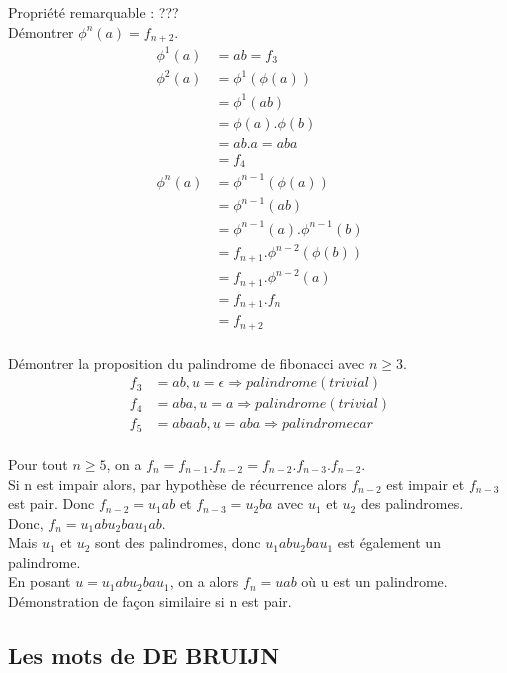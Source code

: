 \documentclass[11pt,a4paper]{article}
\begin{document}
	Propriété remarquable : ???\\
	
	Démontrer $\phi^{n}(a) = f_{n+2}$.
	\begin{align*}
		\phi^{1}(a) &= ab = f_{3}\\
		\phi^{2}(a) &= \phi^{1}(\phi(a))\\
		&= \phi^{1}(ab)\\
		&= \phi(a) . \phi(b)\\
		&= ab . a = aba\\
		&= f_{4}\\
		\phi^{n}(a) &= \phi^{n-1}(\phi(a))\\
		&= \phi^{n-1}(ab)\\
		&= \phi^{n-1}(a) . \phi^{n-1}(b)\\
		&= f_{n+1} . \phi^{n-2}(\phi(b))\\
		&= f_{n+1} . \phi^{n-2}(a)\\
		&= f_{n+1} . f_{n}\\
		&= f_{n+2}\\
	\end{align*}
	
	Démontrer la proposition du palindrome de fibonacci avec $n \geq 3$.\\
	\begin{align*}
		f_3 &= ab, u = \epsilon \Rightarrow palindrome (trivial)\\
		f_4 &= aba, u = a \Rightarrow palindrome (trivial)\\
		f_5 &= abaab, u = aba \Rightarrow palindrome car \\
	\end{align*}
	
	Pour tout $n \geq 5$, on a $f_n = f_{n-1} . f_{n-2} = f_{n-2} . f_{n-3} . f_{n-2}$.\\
	
	Si n est impair alors, par hypothèse de récurrence alors $f_{n-2}$ est impair et $f_{n-3}$ est pair. Donc $f_{n-2} = u_1ab$ et $f_{n-3} = u_2ba$ avec $u_1$ et $u_2$ des palindromes.\\
	Donc, $f_n = u_1abu_2bau_1ab$.\\
	Mais $u_1$ et $u_2$ sont des palindromes, donc $u_1abu_2bau_1$ est également un palindrome.\\
	En posant $u = u_1abu_2bau_1$, on a alors $f_n = uab$ où u est un palindrome.\\
	
	Démonstration de façon similaire si n est pair.
	\newpage
	\subsection{Les mots de DE BRUIJN}
	
\end{document}
